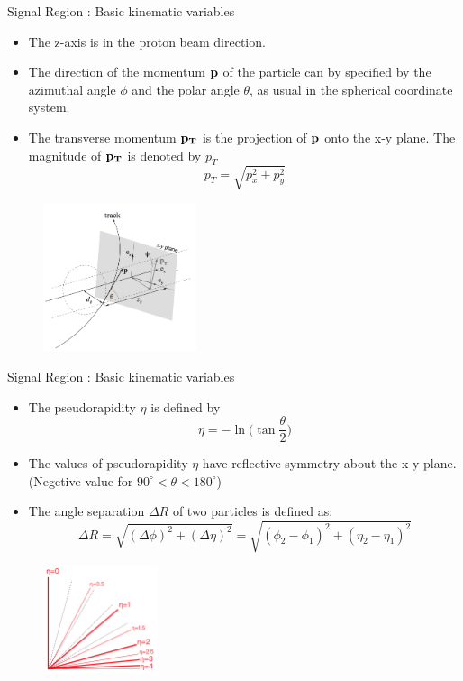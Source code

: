 \documentclass[mathserif,serif]{beamer}
\begin{document}
\begin{frame}{Signal Region : Basic kinematic variables}
\begin{itemize}
\item The z-axis is in the proton beam direction.
\item The direction of the momentum $\bf{p}$ of the particle can by specified by the azimuthal angle $\phi$ and the polar angle $\theta$, as usual in the spherical coordinate system.
\item The transverse momentum $\bf{p}_T$ is the projection of $\bf{p}$ onto the x-y plane. The magnitude of $\bf{p}_T$ is denoted by $p_T$
\begin{equation*}
p_T = \sqrt{p_x^2 + p_y^2}
\end{equation*}
\end{itemize}
\begin{figure}
\centering
\includegraphics[width=0.4\textwidth]{data/photo/detector/impact_parameter.png}
\end{figure}
\end{frame}

\begin{frame}{Signal Region : Basic kinematic variables}
\begin{itemize}
\item The pseudorapidity $\eta$ is defined by
\begin{equation*}
\eta = - \ln \Big( \tan \frac{\theta}{2} \Big)
\end{equation*}
\item The values of pseudorapidity $\eta$ have reflective symmetry about the x-y plane. (Negetive value for $90^{\circ} <\theta< 180^{\circ}$)
\item The angle separation $\Delta R$ of two particles is defined as:
\begin{equation*}
\Delta R = \sqrt{(\Delta \phi) ^2 + (\Delta \eta) ^2}  = \sqrt{(\phi_2 -\phi_1) ^2 + (\eta_2 - \eta_1) ^2}
\end{equation*}
\end{itemize}
\begin{figure}
\centering
\includegraphics[width=0.3\textwidth]{data/photo/detector/pseudorapidity.png}
\end{figure}
\end{frame}
\end{document}
